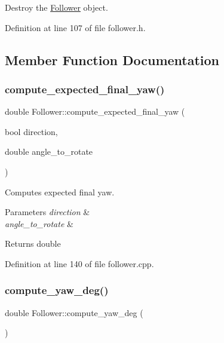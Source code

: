 Destroy the \hyperlink{class_follower}{Follower} object. 



Definition at line 107 of file follower.\+h.



\subsection{Member Function Documentation}
\mbox{\label{class_follower_a5573bec72ce4aed99706213154849b65}} 
\subsubsection{\texorpdfstring{compute\+\_\+expected\+\_\+final\+\_\+yaw()}{compute\_expected\_final\_yaw()}}
{\footnotesize\ttfamily double Follower\+::compute\+\_\+expected\+\_\+final\+\_\+yaw (\begin{DoxyParamCaption}\item[{bool}]{direction,  }\item[{double}]{angle\+\_\+to\+\_\+rotate }\end{DoxyParamCaption})}



Computes expected final yaw. 


\begin{DoxyParams}{Parameters}
{\em direction} & \\
\hline
{\em angle\+\_\+to\+\_\+rotate} & \\
\hline
\end{DoxyParams}
\begin{DoxyReturn}{Returns}
double 
\end{DoxyReturn}


Definition at line 140 of file follower.\+cpp.

\mbox{\label{class_follower_ac988cad87474cb64ef3be7fe197d90a7}} 
\subsubsection{\texorpdfstring{compute\+\_\+yaw\+\_\+deg()}{compute\_yaw\_deg()}}
{\footnotesize\ttfamily double Follower\+::compute\+\_\+yaw\+\_\+deg (\begin{DoxyParamCaption}{ }\end{DoxyParamCaption})}



